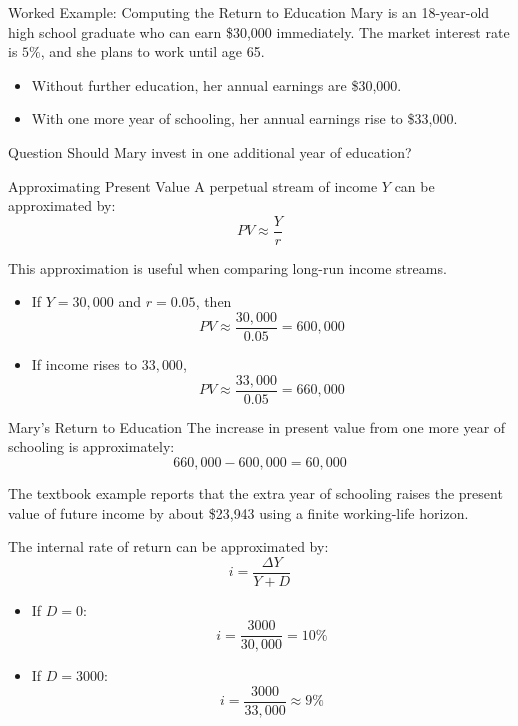 \documentclass[aspectratio=169]{beamer}
\begin{document}
\begin{frame}{Worked Example: Computing the Return to Education}
\transfade
Mary is an 18-year-old high school graduate who can earn \$30{,}000 immediately.
The market interest rate is \(5\%\), and she plans to work until age 65.
\begin{itemize}[<+->]
  \item Without further education, her annual earnings are \$30{,}000.
  \item With one more year of schooling, her annual earnings rise to \$33{,}000.
\end{itemize}

\begin{block}{Question}
Should Mary invest in one additional year of education?
\end{block}
\end{frame}

\begin{frame}{Approximating Present Value}
\transfade
A perpetual stream of income \(Y\) can be approximated by:
\[
PV \approx \frac{Y}{r}
\]

This approximation is useful when comparing long-run income streams.

\begin{itemize}[<+->]
  \item If \(Y = 30{,}000\) and \(r = 0.05\), then
  \[
  PV \approx \frac{30{,}000}{0.05} = 600{,}000
  \]
  \item If income rises to \(33{,}000\),
  \[
  PV \approx \frac{33{,}000}{0.05} = 660{,}000
  \]
\end{itemize}
\end{frame}

\begin{frame}{Mary's Return to Education}
\transfade
The increase in present value from one more year of schooling is approximately:
\[
660{,}000 - 600{,}000 = 60{,}000
\]

The textbook example reports that the extra year of schooling raises the present value of future income by about \$23{,}943 using a finite working-life horizon.

The internal rate of return can be approximated by:
\[
i = \frac{\Delta Y}{Y + D}
\]

\begin{itemize}[<+->]
  \item If \(D=0\):
  \[
  i = \frac{3000}{30{,}000}=10\%
  \]
  \item If \(D=3000\):
  \[
  i = \frac{3000}{33{,}000}\approx 9\%
  \]
\end{itemize}
\end{frame}
\end{document}
